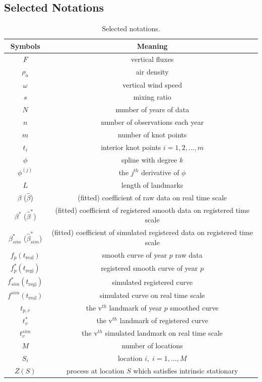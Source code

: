 \documentclass{article}\usepackage[]{graphicx}\usepackage[]{color}
\begin{document}
\clearpage


\begin{appendices}

\section{Selected Notations}

\begin{table}[!ht]
\caption{Selected notations.}\label{Tab:all_symbols}
\centering
\def\arraystretch{1.5}
\begin{tabular}{cc}
\textbf{Symbols} & \textbf{Meaning} \\
\hline\hline
$F$ & vertical fluxes \\
$\rho_a$ & air density\\
$\omega$  & vertical wind speed\\ 
$s$ & mixing ratio\\
\hline \hline
$N$ & number of years of data\\
$n$ & number of observations each year \\
$m$ & number of knot points\\
$t_i$ & interior knot points $i = 1,2,\dots,m$ \\ 
$\phi$ & spline with degree $k$ \\
$\phi^{(j)}$ & the $j^{th}$ derivative of $\phi$ \\
$L$ & length of landmarks\\ 
\hline
$\beta$ ($\widehat{\beta}$) & (fitted) coefficient of raw data on real time scale\\
$\beta^*$ ($\widehat{\beta}^*$) & (fitted) coefficient of registered smooth data on registered time scale\\
$\beta^*_{sim}$ ($\widehat{\beta}^*_{sim}$) & (fitted) coefficient of simulated registered data on registered time scale\\ 
\hline
$f_p(t_{\textrm{real}})$ &  smooth curve of year $p$ raw data\\
$f^*_p(t_{\textrm{regi}})$ & registered smooth curve of year $p$ \\
$f_{sim}^*(t_{\textrm{regi}})$ & simulated registered curve\\
$f^{sim}(t_{\textrm{real}})$ & simulated curve on real time scale\\
\hline
$t_{p,v}$ & the v$^{th}$ landmark of year $p$ smoothed curve \\
$t_v^*$ & the v$^{th}$ landmark of registered curve\\
$t_v^{sim}$ & the v$^{th}$ simulated landmark on real time scale\\
\hline\hline
$M$ & number of locations\\
$S_i$ & location $i,\;i=1,\dots,M$\\
$Z(S)$ & process at location $S$ which satisfies intrinsic stationary\\ 
\hline \hline
\end{tabular}
\end{table}


\end{appendices}
\end{document}
